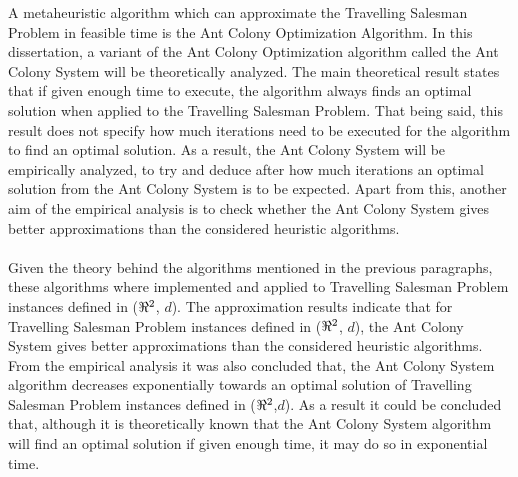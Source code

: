 \documentclass[12pt]{article}
\numberwithin{equation}{subsection}
\numberwithin{table}{subsection}
\numberwithin{algorithm}{subsection}
\numberwithin{figure}{subsection}
\begin{document}
A metaheuristic algorithm which can approximate the Travelling Salesman Problem in feasible time is the Ant Colony Optimization Algorithm. In this dissertation, a variant of the Ant Colony Optimization algorithm called the Ant Colony System will be theoretically analyzed. The main theoretical result states that if given enough time to execute, the algorithm always finds an optimal solution when applied to the Travelling Salesman Problem. That being said, this result does not specify how much iterations need to be executed for the algorithm to find an optimal solution. As a result, the Ant Colony System will be empirically analyzed, to try and deduce after how much iterations an optimal solution from the Ant Colony System is to be expected. Apart from this, another aim of the empirical analysis is to check whether the Ant Colony System gives better approximations than the considered heuristic algorithms.\\\\
Given the theory behind the algorithms mentioned in the previous paragraphs, these algorithms where implemented and applied to Travelling Salesman Problem instances defined in ($\real^2$, $d$). The approximation results indicate that for Travelling Salesman Problem instances defined in ($\real^2$, $d$), the Ant Colony System gives better approximations than the considered heuristic algorithms. From the empirical analysis it was also concluded that, the Ant Colony System algorithm decreases exponentially towards an optimal solution of Travelling Salesman Problem instances defined in ($\real^2$,$d$). As a result it could be concluded that, although it is theoretically known that the Ant Colony System algorithm will find an optimal solution if given enough time, it may do so in exponential time.
\newpage
\tableofcontents
\newpage
{}
{}
\end{document}
